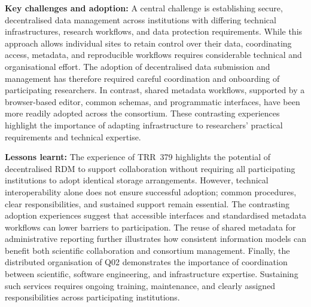 \documentclass{eceasst}
\begin{document}
\medskip
\noindent\textbf{Key challenges and adoption:}
A central challenge is establishing secure, decentralised
data management across institutions with differing
technical infrastructures, research workflows, and
data protection requirements.
While this approach allows individual sites to retain
control over their data, coordinating access, metadata,
and reproducible workflows requires considerable
technical and organisational effort.
The adoption of decentralised data submission and
management has therefore required careful coordination
and onboarding of participating researchers.
In contrast, shared metadata workflows, supported by
a browser-based editor, common schemas, and programmatic
interfaces, have been more readily adopted across the
consortium. These contrasting experiences highlight
the importance of adapting infrastructure to researchers'
practical requirements and technical expertise.

\medskip
\noindent\textbf{Lessons learnt:}
The experience of TRR~379 highlights the potential of
decentralised RDM to support collaboration without
requiring all participating institutions to adopt
identical storage arrangements.
However, technical interoperability alone does not
ensure successful adoption; common procedures,
clear responsibilities, and sustained support remain
essential.
The contrasting adoption experiences suggest that
accessible interfaces and standardised metadata workflows
can lower barriers to participation.
The reuse of shared metadata for administrative reporting
further illustrates how consistent information models
can benefit both scientific collaboration and consortium
management.
Finally, the distributed organisation of Q02 demonstrates
the importance of coordination between scientific,
software engineering, and infrastructure expertise.
Sustaining such services requires ongoing training,
maintenance, and clearly assigned responsibilities
across participating institutions.

\end{document}
